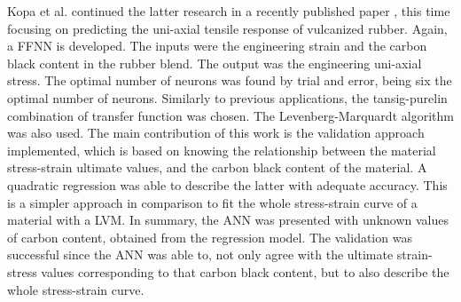 Kopa et al. continued the latter research in a recently published paper \cite{kopal2018prediction}, this time focusing on predicting the uni-axial tensile response of vulcanized rubber. Again, a FFNN is developed. The inputs were the engineering strain and the carbon black content in the rubber blend. The output was the engineering uni-axial stress. The optimal number of neurons was found by trial and error, being six the optimal number of neurons. Similarly to previous applications, the tansig-purelin combination of transfer function was chosen. The Levenberg-Marquardt algorithm was also used. The main contribution of this work is the validation approach implemented, which is based on knowing the relationship between the material stress-strain ultimate values, and the carbon black content of the material. A quadratic regression was able to describe the latter with adequate accuracy. This is a simpler approach in comparison to fit the whole stress-strain curve of a material with a LVM. In summary, the ANN was presented with unknown values of carbon content, obtained from the regression model. The validation was successful since the ANN was able to, not only agree with the ultimate strain-stress values corresponding to that carbon black content, but to also describe the whole stress-strain curve.

